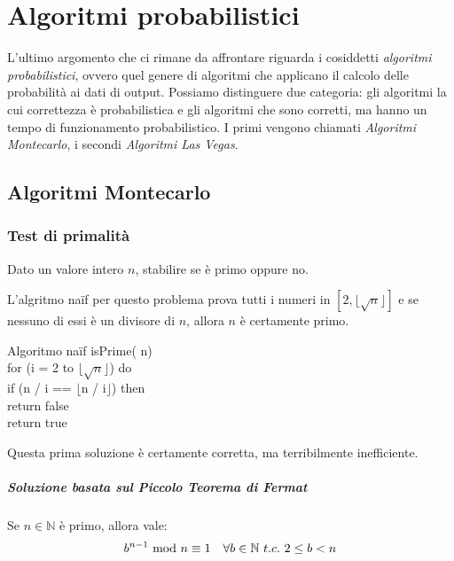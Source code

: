 \chapter{Algoritmi probabilistici}
L'ultimo argomento che ci rimane da affrontare riguarda i
cosiddetti \emph{algoritmi probabilistici}, ovvero quel genere di algoritmi
che applicano il calcolo delle probabilità ai dati di output. Possiamo
distinguere due categoria: gli algoritmi la cui correttezza è probabilistica
e gli algoritmi che sono corretti, ma hanno un tempo di funzionamento
probabilistico. I primi vengono chiamati \emph{Algoritmi Montecarlo},
i secondi \emph{Algoritmi Las Vegas}.

\section{Algoritmi Montecarlo}
\subsection{Test di primalità}
\begin{problem}
    Dato un valore intero $n$, stabilire se è primo oppure no.
\end{problem}

\noindent
L'algritmo naïf per questo problema prova tutti i numeri in $[2,\lfloor
\sqrt{n}\rfloor]$ e se nessuno di essi è un divisore di $n$, allora $n$
è certamente primo.

\begin{minicode}{Algoritmo naïf}
\ind{} isPrime( n)\\
    \indf for (i = 2 to $\lfloor\sqrt{n}\rfloor$) do\\
        \indff if (n / i == $\lfloor$n / i$\rfloor$) then\\
            return false\\
    \indf return true
\end{minicode}

\noindent
Questa prima soluzione è certamente corretta, ma terribilmente inefficiente.

\paragraph{Soluzione basata sul Piccolo Teorema di Fermat}
\begin{definition}
    Se $n\in\mathbb{N}$ è primo, allora vale:
    \[b^{n-1}\ \mathrm{mod}\ n\equiv 1\quad\forall b\in\mathbb{N}\ t.c.\ 2\leq b<n\]
\end{definition}

